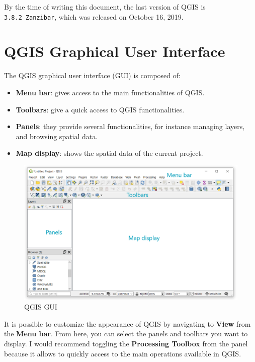 \documentclass[]{book}
\providecommand{\tightlist}{%
  \setlength{\itemsep}{0pt}\setlength{\parskip}{0pt}}
\theoremstyle{definition}
\theoremstyle{definition}
\theoremstyle{definition}
\theoremstyle{remark}
\begin{document}
By the time of writing this document, the last version of QGIS is
\texttt{3.8.2\ Zanzibar}, which was released on October 16, 2019.

\section{QGIS Graphical User
Interface}\label{qgis-graphical-user-interface}

The QGIS graphical user interface (GUI) is composed of:

\begin{itemize}
\tightlist
\item
  \textbf{Menu bar}: gives access to the main functionalities of QGIS.
\item
  \textbf{Toolbars}: give a quick access to QGIS functionalities.
\item
  \textbf{Panels}: they provide several functionalities, for instance
  managing layers, and browsing spatial data.
\item
  \textbf{Map display}: shows the spatial data of the current project.
\end{itemize}

\begin{figure}

{\centering \includegraphics[width=16.19in]{figures/QGIS_interface} 

}

\caption{QGIS GUI}\label{fig:unnamed-chunk-1}
\end{figure}

It is possible to customize the appearance of QGIS by navigating to
\textbf{View} from the \textbf{Menu bar}. From here, you can select the
panels and toolbars you want to display. I would recommend toggling the
\textbf{Processing Toolbox} from the panel because it allows to quickly
access to the main operations available in QGIS.
\end{document}
